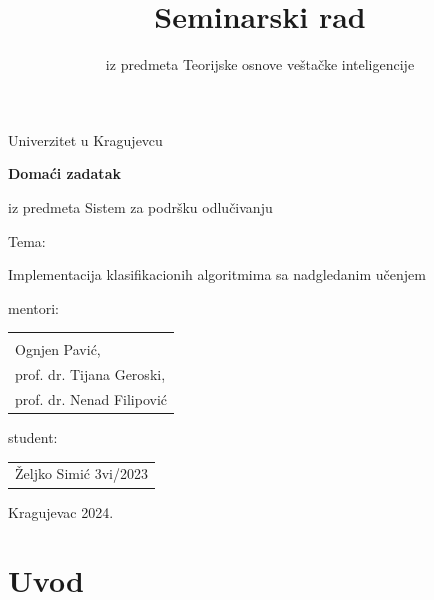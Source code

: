 \documentclass[fontsize=12bp, paper=a4]{scrarticle}
\title{Seminarski rad}
\subtitle{iz predmeta Teorijske osnove veštačke inteligencije}
\begin{document}
\begin{titlepage}
    
    \begin{center}
        
        \vspace*{8cm}
        
        \large{Univerzitet u Kragujevcu}
        
        \vspace*{1cm}

        {\bfseries \LARGE Domaći zadatak}
        
        \large{iz predmeta Sistem za podršku odlučivanju}
        
        \vspace*{1cm}
        \large{Tema:}

        \Large{Implementacija klasifikacionih algoritmima sa nadgledanim učenjem}


        \vspace*{2cm}
    \end{center}
    \hfill{\parbox[s]{8cm}{

    mentori: 
    \begin{tabular}{l}
        \\
        \\
        Ognjen Pavić, \\
        prof. dr. Tijana Geroski, \\
        prof. dr. Nenad Filipović 
    \end{tabular}
    
    student: \begin{tabular}{l}
        Željko Simić 3vi/2023
    \end{tabular}
    }}

    \hspace*{\fill} 

    \vspace*{2cm}

    \begin{center}
        Kragujevac 2024.
    \end{center}
\end{titlepage}


\setcounter{page}{1}
\justifying
\linespread{0.9}
\cfoot[\pagemark]{\pagemark}
\ofoot[]{}
\chead[]{}
%
\justifying

\section{Uvod}
\end{document}
